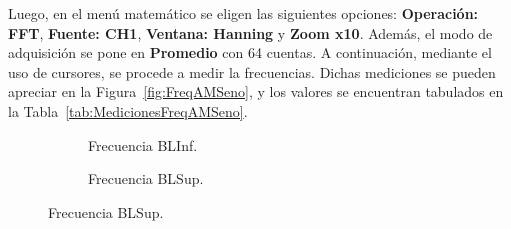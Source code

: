       Luego, en el menú matemático se eligen las siguientes opciones: \textbf{Operación: FFT}, \textbf{Fuente: CH1},
      \textbf{Ventana: Hanning} y \textbf{Zoom x10}. Además, el modo de adquisición se pone en \textbf{Promedio} con 
      64 cuentas. A continuación, mediante el uso de cursores, se procede a medir la frecuencias. Dichas mediciones se 
      pueden apreciar en la Figura~\ref{fig:FreqAMSeno}, y los valores se encuentran tabulados en la 
      Tabla~\ref{tab:MedicionesFreqAMSeno}.

      \begin{figure}[H]
        \centering
        \begin{subfigure}[H]{0.48\textwidth}
          \caption{Frecuencia BLInf.}
          \label{fig:FreqBLInfAMSeno}
        \end{subfigure}
        \hfill 
        \begin{subfigure}[H]{0.48\textwidth}
          \caption{Frecuencia BLSup.}
          \label{fig:FreqBLSupAMSeno}
        \end{subfigure}
      

\end{figure}
